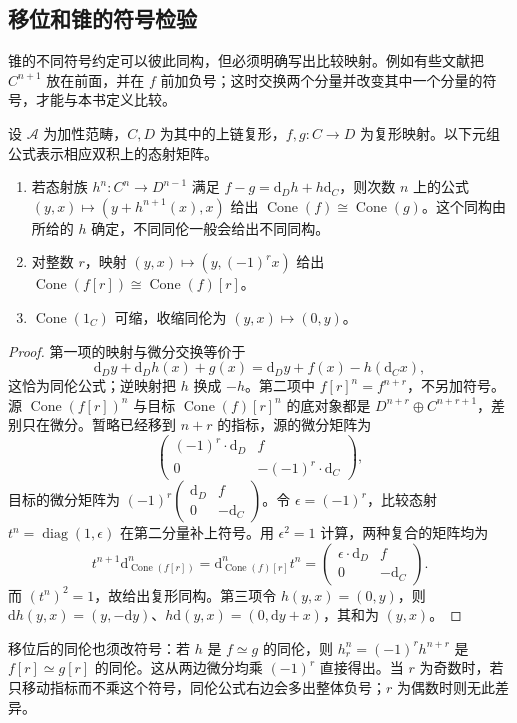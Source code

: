 \subsection{移位和锥的符号检验}
\label{b4:subsec:0602:03}

锥的不同符号约定可以彼此同构，但必须明确写出比较映射。例如有些文献把 \(C^{n+1}\) 放在前面，并在 \(f\) 前加负号；这时交换两个分量并改变其中一个分量的符号，才能与本书定义比较。

\begin{proposition}\label{b4:prop:cone-sign-compatibility}
	设 \(\mathcal A\) 为加性范畴，\(C,D\) 为其中的上链复形，\(f,g:C\to D\) 为复形映射。以下元组公式表示相应双积上的态射矩阵。
	\begin{enumerate}
		\item 若态射族 \(h^n:C^n\to D^{n-1}\) 满足 \(f-g=\mathrm{d}_Dh+h\mathrm{d}_C\)，则次数 \(n\) 上的公式 \((y,x)\mapsto(y+h^{n+1}(x),x)\) 给出 \(\operatorname{Cone}(f)\cong\operatorname{Cone}(g)\)。这个同构由所给的 \(h\) 确定，不同同伦一般会给出不同同构。
		\item 对整数 \(r\)，映射 \((y,x)\mapsto(y,(-1)^r x)\) 给出 \(\operatorname{Cone}(f[r])\cong\operatorname{Cone}(f)[r]\)。
		\item \(\operatorname{Cone}(1_C)\) 可缩，收缩同伦为 \((y,x)\mapsto(0,y)\)。
	\end{enumerate}
\end{proposition}
\begin{proof}
	第一项的映射与微分交换等价于
	\[
		\mathrm{d}_Dy+\mathrm{d}_Dh(x)+g(x)=\mathrm{d}_Dy+f(x)-h(\mathrm{d}_Cx),
	\]
	这恰为同伦公式；逆映射把 \(h\) 换成 \(-h\)。第二项中 \(f[r]^n=f^{n+r}\)，不另加符号。源 \(\operatorname{Cone}(f[r])^n\) 与目标 \(\operatorname{Cone}(f)[r]^n\) 的底对象都是 \(D^{n+r}\oplus C^{n+r+1}\)，差别只在微分。暂略已经移到 \(n+r\) 的指标，源的微分矩阵为
	\[
		\begin{pmatrix}(-1)^r\cdot\mathrm{d}_D&f\\0&-(-1)^r\cdot\mathrm{d}_C\end{pmatrix},
	\]
	目标的微分矩阵为 \((-1)^r\begin{pmatrix}\mathrm{d}_D&f\\0&-\mathrm{d}_C\end{pmatrix}\)。令 \(\epsilon=(-1)^r\)，比较态射 \(t^n=\operatorname{diag}(1,\epsilon)\) 在第二分量补上符号。用 \(\epsilon^2=1\) 计算，两种复合的矩阵均为
	\[
		t^{n+1}\mathrm{d}_{\operatorname{Cone}(f[r])}^n =\mathrm{d}_{\operatorname{Cone}(f)[r]}^nt^n
		=\begin{pmatrix}\epsilon\cdot\mathrm{d}_D&f\\0&-\mathrm{d}_C\end{pmatrix}.
	\]
	而 \((t^n)^2=1\)，故给出复形同构。第三项令 \(h(y,x)=(0,y)\)，则 \(\mathrm{d}h(y,x)=(y,-\mathrm{d}y)\)、\(h\mathrm{d}(y,x)=(0,\mathrm{d}y+x)\)，其和为 \((y,x)\)。
\end{proof}

移位后的同伦也须改符号：若 \(h\) 是 \(f\simeq g\) 的同伦，则 \(h_r^n=(-1)^r h^{n+r}\) 是 \(f[r]\simeq g[r]\) 的同伦。这从两边微分均乘 \((-1)^r\) 直接得出。当 \(r\) 为奇数时，若只移动指标而不乘这个符号，同伦公式右边会多出整体负号；\(r\) 为偶数时则无此差异。
